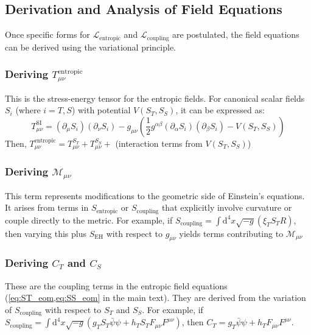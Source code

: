 \documentclass[11pt,a4paper]{article}
\newcommand{\Mmu}{\mathcal{M}}
\newcommand{\SEH}{S_\mathrm{EH}}
\newcommand{\ST}{S_T}
\newcommand{\SSp}{S_S}
\newcommand{\Scoupling}{S_{\text{coupling}}}
\newcommand{\Sentropic}{S_{\text{entropic}}}
\newcommand{\Tmnentropic}{T^{\text{entropic}}_{\mu\nu}}
\newcommand{\Tmu}{T_{\mu\nu}}
\begin{document}
\subsection{Derivation and Analysis of Field Equations}
Once specific forms for $\mathcal{L}_{\text{entropic}}$ and $\mathcal{L}_{\text{coupling}}$ are postulated, the field equations can be derived using the variational principle.

\subsubsection{Deriving $\Tmnentropic$}
This is the stress-energy tensor for the entropic fields. For canonical scalar fields $S_i$ (where $i=T,S$) with potential $V(\ST,\SSp)$, it can be expressed as:
\begin{equation*}
T^{\text{SI}}_{\mu\nu}=(\partial_\mu S_i)(\partial_\nu S_i)-g_{\mu\nu}\left(\frac{1}{2}g^{\alpha\beta}(\partial_\alpha S_i)(\partial_\beta S_i)-V(\ST,\SSp)\right)
\end{equation*}
Then, $\Tmnentropic=\Tmu^{\ST}+\Tmu^{\SSp}+$ (interaction terms from $V(\ST,\SSp)$)

\subsubsection{Deriving $\Mmu_{\mu\nu}$}
This term represents modifications to the geometric side of Einstein's equations. It arises from terms in $\Sentropic$ or $\Scoupling$ that explicitly involve curvature or couple directly to the metric. For example, if $\Scoupling=\int\text{d}^4x\sqrt{-g}(\xi_T\ST R)$, then varying this plus $\SEH$ with respect to $g_{\mu\nu}$ yields terms contributing to $\Mmu_{\mu\nu}$

\subsubsection{Deriving $C_T$ and $C_S$}
\label{app:B.3.3}
These are the coupling terms in the entropic field equations (\cref{eq:ST_eom,eq:SS_eom} in the main text). They are derived from the variation of $\Scoupling$ with respect to $\ST$ and $\SSp$. For example, if $\Scoupling=\int\text{d}^4x\sqrt{-g}(g_T\ST\bar{\psi}\psi+h_T\ST F_{\mu\nu}F^{\mu\nu})$, then $C_T=g_T\bar{\psi}\psi+h_T F_{\mu\nu}F^{\mu\nu}$.
\end{document}
